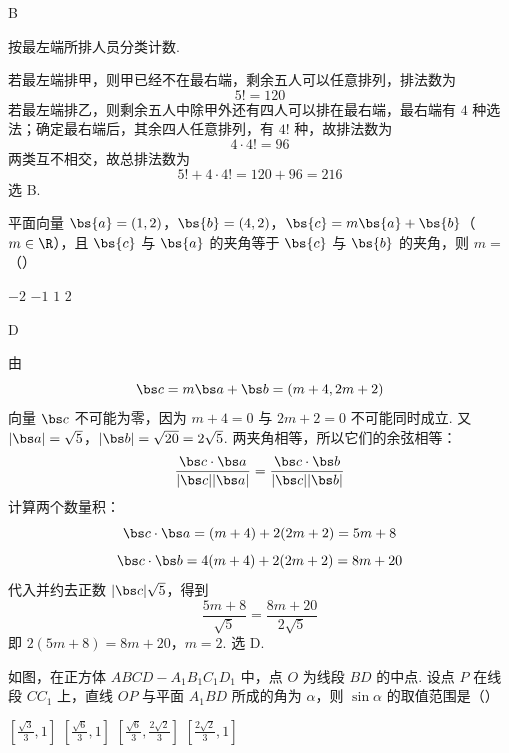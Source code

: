 \begin{answer}
B
\end{answer}

\begin{solution}
按最左端所排人员分类计数.

若最左端排甲，则甲已经不在最右端，剩余五人可以任意排列，排法数为
\[
5!=120
\]
若最左端排乙，则剩余五人中除甲外还有四人可以排在最右端，最右端有 \(4\) 种选法；确定最右端后，其余四人任意排列，有 \(4!\) 种，故排法数为
\[
4\cdot4!=96
\]
两类互不相交，故总排法数为
\[
5!+4\cdot4!=120+96=216
\]
选 B.
\end{solution}

\begin{problem}
平面向量 \(\bs{a} = (1, 2)\)，\(\bs{b} = (4, 2)\)，\(\bs{c} = m\bs{a} + \bs{b}\)（\(m \in \R\)），且 \(\bs{c}\) 与 \(\bs{a}\) 的夹角等于 \(\bs{c}\) 与 \(\bs{b}\) 的夹角，则 \(m =\)（\quad）

\choices
    {\(-2\)}
    {\(-1\)}
    {\(1\)}
    {\(2\)}
\end{problem}

\begin{answer}
D
\end{answer}

\begin{solution}
由
\[
\bs c=m\bs a+\bs b=(m+4,2m+2)
\]
向量 \(\bs c\) 不可能为零，因为 \(m+4=0\) 与 \(2m+2=0\) 不可能同时成立. 又
\(|\bs a|=\sqrt5\)，\(|\bs b|=\sqrt{20}=2\sqrt5\).
两夹角相等，所以它们的余弦相等：
\[
\frac{\bs c\cdot\bs a}{|\bs c||\bs a|}=\frac{\bs c\cdot\bs b}{|\bs c||\bs b|}
\]
计算两个数量积：
\[
\bs c\cdot\bs a=(m+4)+2(2m+2)=5m+8
\]
\[
\bs c\cdot\bs b=4(m+4)+2(2m+2)=8m+20
\]
代入并约去正数 \(|\bs c|\sqrt5\)，得到
\[
\frac{5m+8}{\sqrt5}=\frac{8m+20}{2\sqrt5}
\]
即
\(2(5m+8)=8m+20\)，\(m=2\).
选 D.
\end{solution}

\begin{problem}
如图，在正方体 \(ABCD - A_{1}B_{1}C_{1}D_{1}\) 中，点 \(O\) 为线段 \(BD\) 的中点. 设点 \(P\) 在线段 \(CC_{1}\) 上，直线 \(OP\) 与平面 \(A_{1}BD\) 所成的角为 \(\alpha\)，则 \(\sin \alpha\) 的取值范围是（\quad）


\choices
    {\( \left[\frac{\sqrt{3}}{3},1\right] \)}
    {\( \left[\frac{\sqrt{6}}{3},1\right] \)}
    {\( \left[\frac{\sqrt{6}}{3},\frac{2\sqrt{2}}{3}\right] \)}
    {\( \left[\frac{2\sqrt{2}}{3},1\right] \)}
\end{problem}

